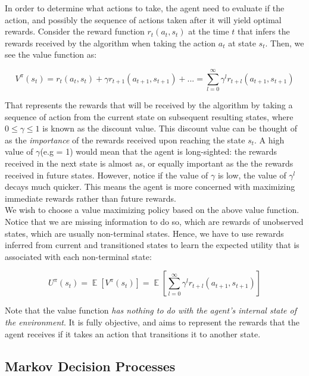 \documentclass[12pt]{article}
\DeclareMathOperator{\E}{\mathbb{E}}
\begin{document}
In order to determine what actions to take, the agent need to evaluate if the action, and possibly the sequence of actions taken after it will yield optimal rewards. Consider the reward function $r_t(a_t, s_t)$ at the time $t$ that infers the rewards received by the algorithm when taking the action $a_t$ at state $s_t$. Then, we see the value function as:  

\begin{equation*}
V^{\pi}(s_t) = r_t(a_t, s_t) + \gamma r_{t+1}(a_{t+1}, s_{t+1}) + ... = \sum^{\infty}_{l = 0} \gamma^l r_{t+l}(a_{t+1}, s_{t+1})
\end{equation*}

That represents the rewards that will be received by the algorithm by taking a sequence of action from the current state on subsequent resulting states, where $0 \leq \gamma \leq 1$ is known as the discount value. This discount value can be thought of as the \textit{importance} of the rewards received upon reaching the state $s_t$. A high value of $\gamma$(e.g = 1) would mean that the agent is long-sighted: the rewards received in the next state is almost as, or equally important as the the rewards received in future states. However, notice if the value of $\gamma$ is low, the value of $\gamma^l$ decays much quicker. This means the agent is more concerned with maximizing immediate rewards rather than future rewards.\\

We wish to choose a value maximizing policy based on the above value function. Notice that we are missing information to do so, which are rewards of unobserved states, which are usually non-terminal states. Hence, we have to use rewards inferred from current and transitioned states to learn the expected utility that is associated with each non-terminal state:

\begin{equation*}
U^{\pi}(s_t) = \E[V^{\pi}(s_t)] = \E[\sum^{\infty}_{l = 0} \gamma^l r_{t+l}(a_{t+1}, s_{t+1})]
\end{equation*}

Note that the value function \textit{has nothing to do with the agent's internal state of the environment}. It is fully objective, and aims to represent the rewards that the agent receives if it takes an action that transitions it to another state.

\subsection{Markov Decision Processes}
\end{document}
